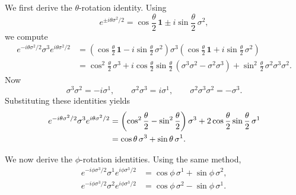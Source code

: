 \documentclass[11pt]{article}
\theoremstyle{definition}
\numberwithin{theorem}{section}
\numberwithin{equation}{section}
\begin{document}
\medskip

\noindent We first derive the $\theta$-rotation identity. Using
\begin{equation*}
e^{\pm i\theta\sigma^2/2} = \cos\frac{\theta}{2}\,\mathbf{1} \pm i\sin\frac{\theta}{2}\,\sigma^2,
\end{equation*}
we compute
\begin{align*}
e^{-i\theta\sigma^2/2}\sigma^3 e^{i\theta\sigma^2/2}
&=
\left(\cos\frac{\theta}{2}\,\mathbf{1} - i\sin\frac{\theta}{2}\,\sigma^2\right)
\sigma^3
\left(\cos\frac{\theta}{2}\,\mathbf{1} + i\sin\frac{\theta}{2}\,\sigma^2\right) \\
&=
\cos^2\frac{\theta}{2}\,\sigma^3
+ i\cos\frac{\theta}{2}\sin\frac{\theta}{2}\,(\sigma^3\sigma^2 - \sigma^2\sigma^3)
+ \sin^2\frac{\theta}{2}\,\sigma^2\sigma^3\sigma^2.
\end{align*}
Now
\begin{equation*}
\sigma^3\sigma^2 = -i\sigma^1,
\qquad
\sigma^2\sigma^3 = i\sigma^1,
\qquad
\sigma^2\sigma^3\sigma^2 = -\sigma^3.
\end{equation*}
Substituting these identities yields
\begin{align}
e^{-i\theta\sigma^2/2}\sigma^3 e^{i\theta\sigma^2/2}
&=
\left(\cos^2\frac{\theta}{2} - \sin^2\frac{\theta}{2}\right)\sigma^3
+ 2\cos\frac{\theta}{2}\sin\frac{\theta}{2}\,\sigma^1 \notag\\
&= \cos\theta\,\sigma^3 + \sin\theta\,\sigma^1.
\label{eq:theta-conjugation}
\end{align}

\medskip

\noindent We now derive the $\phi$-rotation identities. Using the same method,
\begin{align}
e^{-i\phi\sigma^3/2}\sigma^1 e^{i\phi\sigma^3/2}
&= \cos\phi\,\sigma^1 + \sin\phi\,\sigma^2,
\label{eq:phi-conjugation-1}\\
e^{-i\phi\sigma^3/2}\sigma^2 e^{i\phi\sigma^3/2}
&= \cos\phi\,\sigma^2 - \sin\phi\,\sigma^1.
\label{eq:phi-conjugation-2}
\end{align}

\medskip
\end{document}

